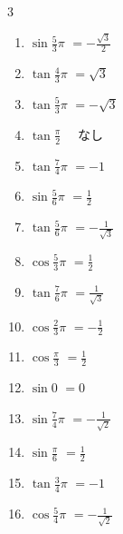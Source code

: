 \begin{multicols}{3}
\begin{enumerate}
  \item $\displaystyle \sin{\frac{5}{3}\pi}$
        $\displaystyle =-\frac{\sqrt{3}}{2}$

  \item $\displaystyle \tan{\frac{4}{3}\pi}$
        $\displaystyle =\sqrt{3}$

  \item $\displaystyle \tan{\frac{5}{3}\pi}$
        $\displaystyle =-\sqrt{3}$

  \item $\displaystyle \tan{\frac{\pi}{2}}$
        $\displaystyle \quad なし$

  \item $\displaystyle \tan{\frac{7}{4}\pi}$
        $\displaystyle =-1$

  \item $\displaystyle \sin{\frac{5}{6}\pi}$
        $\displaystyle =\frac{1}{2}$

  \item $\displaystyle \tan{\frac{5}{6}\pi}$
        $\displaystyle =-\frac{1}{\sqrt{3}}$

  \item $\displaystyle \cos{\frac{5}{3}\pi}$
        $\displaystyle =\frac{1}{2}$

  \item $\displaystyle \tan{\frac{7}{6}\pi}$
        $\displaystyle =\frac{1}{\sqrt{3}}$

  \item $\displaystyle \cos{\frac{2}{3}\pi}$
        $\displaystyle =-\frac{1}{2}$

  \item $\displaystyle \cos{\frac{\pi}{3}}$
        $\displaystyle =\frac{1}{2}$

  \item $\displaystyle \sin{0}$
        $\displaystyle =0$

\columnbreak %

  \item $\displaystyle \sin{\frac{7}{4}\pi}$
        $\displaystyle =-\frac{1}{\sqrt{2}}$

  \item $\displaystyle \sin{\frac{\pi}{6}}$
        $\displaystyle =\frac{1}{2}$

  \item $\displaystyle \tan{\frac{3}{4}\pi}$
        $\displaystyle =-1$

  \item $\displaystyle \cos{\frac{5}{4}\pi}$
        $\displaystyle =-\frac{1}{\sqrt{2}}$


\end{enumerate}
\end{multicols}
